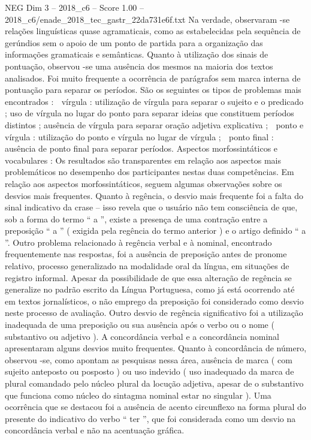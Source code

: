 \begin{textsample}{NEG Dim 3 – 2018\_c6 – Score 1.00 – 2018\_c6/enade\_2018\_tec\_gastr\_22da731e6f.txt}
Na verdade, observaram -se relações linguísticas quase agramaticais, como as estabelecidas pela sequência de gerúndios sem o apoio de um ponto de partida para a organização das informações gramaticais e semânticas.
Quanto à utilização dos sinais de pontuação, observou -se uma ausência dos mesmos na maioria dos textos analisados.
Foi muito frequente a ocorrência de parágrafos sem marca interna de pontuação para separar os períodos.
São os seguintes os tipos de problemas mais encontrados :  vírgula : utilização de vírgula para separar o sujeito e o predicado ; uso de vírgula no lugar do ponto para separar ideias que constituem períodos distintos ; ausência de vírgula para separar oração adjetiva explicativa ;  ponto e vírgula : utilização do ponto e vírgula no lugar de vírgula ;  ponto final : ausência de ponto final para separar períodos.
Aspectos morfossintáticos e vocabulares : Os resultados são transparentes em relação aos aspectos mais problemáticos no desempenho dos participantes nestas duas competências.
Em relação aos aspectos morfossintáticos, seguem algumas observações sobre os desvios mais frequentes.
Quanto à regência, o desvio mais frequente foi a falta do sinal indicativo da crase – isso revela que o usuário não tem consciência de que, sob a forma do termo “ a ”, existe a presença de uma contração entre a preposição “ a ” ( exigida pela regência do termo anterior ) e o artigo definido “ a ”.
Outro problema relacionado à regência verbal e à nominal, encontrado frequentemente nas respostas, foi a ausência de preposição antes de pronome relativo, processo generalizado na modalidade oral da língua, em situações de registro informal.
Apesar da possibilidade de que essa alteração de regência se generalize no padrão escrito da Língua Portuguesa, como já está ocorrendo até em textos jornalísticos, o não emprego da preposição foi considerado como desvio neste processo de avaliação.
Outro desvio de regência significativo foi a utilização inadequada de uma preposição ou sua ausência após o verbo ou o nome ( substantivo ou adjetivo ).
A concordância verbal e a concordância nominal apresentaram alguns desvios muito frequentes.
Quanto à concordância de número, observou -se, como apontam as pesquisas nessa área, ausência de marca ( com sujeito anteposto ou posposto ) ou uso indevido ( uso inadequado da marca de plural comandado pelo núcleo plural da locução adjetiva, apesar de o substantivo que funciona como núcleo do sintagma nominal estar no singular ).
Uma ocorrência que se destacou foi a ausência de acento circunflexo na forma plural do presente do indicativo do verbo “ ter ”, que foi considerada como um desvio na concordância verbal e não na acentuação gráfica.

\end{textsample}
